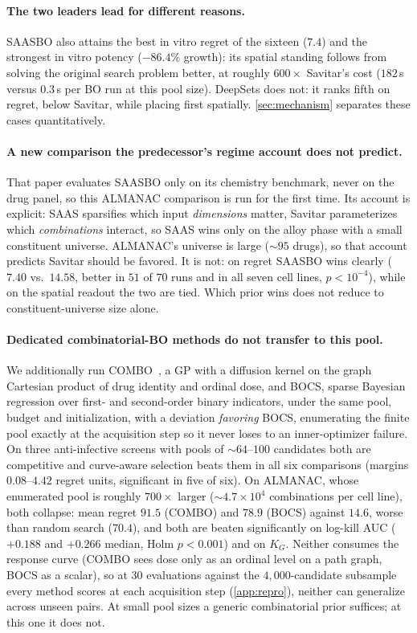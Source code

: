 \documentclass{article}
\begin{document}
\paragraph{The two leaders lead for different reasons.} SAASBO also attains
the best in vitro regret of the sixteen ($7.4$) and the strongest in vitro
potency ($-86.4\%$ growth): its spatial standing follows from solving the
original search problem better, at roughly $600\times$ Savitar's cost
($182$\,s versus $0.3$\,s per BO run at this pool size). DeepSets does not: it ranks fifth on regret, below Savitar, while placing first spatially. \cref{sec:mechanism} separates these cases quantitatively.

\paragraph{A new comparison the predecessor's regime account does not
predict.} That paper evaluates SAASBO only on its chemistry benchmark, never
on the drug panel, so this ALMANAC comparison is run for the first time. Its
account is explicit: SAAS sparsifies which input \emph{dimensions} matter,
Savitar parameterizes which \emph{combinations} interact, so SAAS wins only
on the alloy phase with a small constituent universe. ALMANAC's universe is
large (${\sim}95$ drugs), so that account predicts Savitar should be
favored. It is not: on regret SAASBO wins clearly ($7.40$ vs.\ $14.58$,
better in $51$ of $70$ runs and in all seven cell lines, $p < 10^{-4}$),
while on the spatial readout the two are tied. Which prior wins does not
reduce to constituent-universe size alone.

\paragraph{Dedicated combinatorial-BO methods do not transfer to this pool.}
We additionally run COMBO~\citep{oh2019}, a GP with a diffusion kernel on the graph
Cartesian product of drug identity and ordinal dose, and BOCS, sparse
Bayesian regression over first- and second-order binary indicators, under the
same pool, budget and initialization, with a deviation \emph{favoring}
BOCS, enumerating the finite pool exactly at the acquisition step so it never
loses to an inner-optimizer failure. On three anti-infective screens with
pools of ${\sim}64$--$100$ candidates both are competitive and curve-aware
selection beats them in all six comparisons (margins $0.08$--$4.42$ regret
units, significant in five of six). On ALMANAC, whose enumerated pool is
roughly $700\times$ larger (${\sim}4.7 \times 10^4$ combinations per cell
line), both collapse: mean regret $91.5$ (COMBO) and $78.9$
(BOCS) against $14.6$, worse than random search ($70.4$), and both are beaten
significantly on log-kill AUC ($+0.188$ and $+0.266$ median, Holm
$p < 0.001$) and on $K_G$. Neither consumes the response curve (COMBO sees dose only as an ordinal
level on a path graph, BOCS as a scalar), so at 30 evaluations against the $4{,}000$-candidate subsample every method
scores at each acquisition step (\cref{app:repro}), neither can generalize
across unseen pairs. At small
pool sizes a generic combinatorial prior suffices; at this one it does
not.
\end{document}
